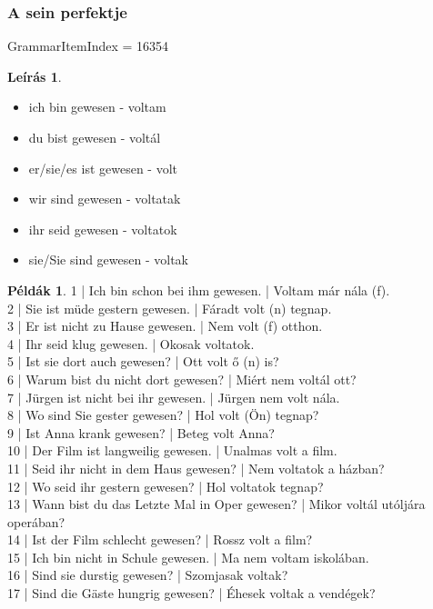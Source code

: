 \documentclass{article}
\theoremstyle{definition}
\newtheorem*{exmp}{Példák}
\newtheorem*{desc}{Leírás}
\begin{document}
\subsubsection{A sein perfektje}

GrammarItemIndex = 16354

\begin{desc}
\begin{itemize}
\item ich bin gewesen - voltam
\item du bist gewesen - voltál
\item er/sie/es ist gewesen - volt
\item wir sind gewesen - voltatak
\item ihr seid gewesen - voltatok
\item sie/Sie sind gewesen - voltak
\end{itemize}
\end{desc}

\begin{exmp}
1 | Ich bin schon bei ihm gewesen. | Voltam már nála (f).\\
2 | Sie ist müde gestern gewesen. | Fáradt volt (n) tegnap.\\
3 | Er ist nicht zu Hause gewesen. | Nem volt (f) otthon.\\
4 | Ihr seid klug gewesen. | Okosak voltatok.\\
5 | Ist sie dort auch gewesen? | Ott volt ő (n) is?\\
6 | Warum bist du nicht dort gewesen? | Miért nem voltál ott?\\
7 | Jürgen ist nicht bei ihr gewesen. | Jürgen nem volt nála.\\
8 | Wo sind Sie gester gewesen? | Hol volt (Ön) tegnap?\\
9 | Ist Anna krank gewesen? | Beteg volt Anna?\\
10 | Der Film ist langweilig gewesen. | Unalmas volt a film.\\
11 | Seid ihr nicht in dem Haus gewesen? | Nem voltatok a házban?\\
12 | Wo seid ihr gestern gewesen? | Hol voltatok tegnap?\\
13 | Wann bist du das Letzte Mal in Oper gewesen? | Mikor voltál utóljára operában?\\
14 | Ist der Film schlecht gewesen? | Rossz volt a film?\\
15 | Ich bin nicht in Schule gewesen. | Ma nem voltam iskolában.\\
16 | Sind sie durstig gewesen? | Szomjasak voltak?\\
17 | Sind die Gäste hungrig gewesen? | Éhesek voltak a vendégek?\\
\end{exmp}
\end{document}
